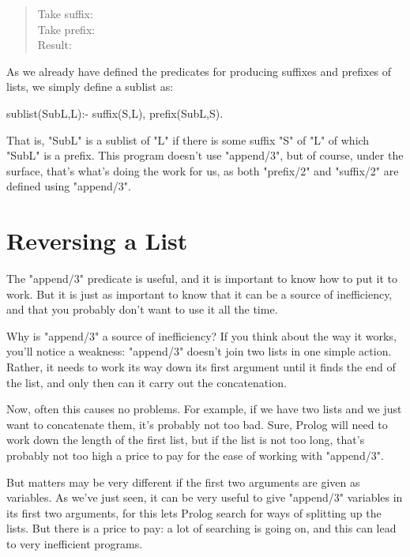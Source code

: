 \begin{quote}
Take suffix: \\[3mm]
Take prefix: \hspace*{23mm}\\[3mm]
Result:     \hspace*{31mm}
\end{quote}


As we already have defined the predicates for producing suffixes and prefixes
of lists, we simply define a sublist as:
\begin{LPNcodedisplay}
sublist(SubL,L):- suffix(S,L), prefix(SubL,S).
\end{LPNcodedisplay}
That is, "SubL" is a sublist of "L" if there is some suffix "S" of "L"
of which "SubL" is a prefix.  This program doesn't
 use "append/3", but of course, under the surface,
that's what's doing the work for us, as both "prefix/2" and "suffix/2" are
defined using "append/3".




\section{Reversing a List}\label{SEC.L6.REVERSE}

The "append/3" predicate is useful, and it is important to know how to
put it to work. But it is just as important to know that it can be a
source of inefficiency, and that you probably don't want to use it all
the time.

Why is "append/3" a source of inefficiency?  If you think about
the way it works, you'll notice a weakness: "append/3" doesn't join
two lists in one simple action. Rather, it needs to work its way down
its first argument until it finds the end of the list, and only then
can it carry out the concatenation.

Now, often this causes no problems. For example, if we have two lists
and we just want to concatenate them, it's probably not too bad. Sure,
Prolog will need to work down the length of the first list, but if the
list is not too long, that's probably not too high a price
to pay for the ease of working with "append/3".

But matters may be very different if the first two arguments are given
as variables. As we've just seen, it can be very useful to give
"append/3" variables in its first two arguments, for this lets
Prolog search for ways of splitting up the lists. But there is a price
to pay: a lot of searching is going on, and this can lead to very
inefficient programs.

